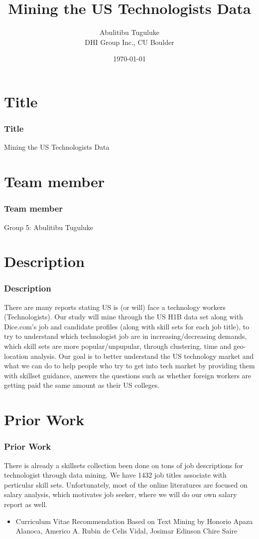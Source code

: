 \documentclass[10pt,mathserif]{beamer}
\title{\large \bfseries Mining the US Technologists Data}
\author{Abulitibu Tuguluke\\[3ex]
	DHI Group Inc., CU Boulder}
\date{\today}
\begin{document}
	
	\frame{
		\thispagestyle{empty}
		\titlepage
	}
	
	\section{Title}
	\begin{frame}
		\frametitle{Title}
		\centering
\large {Mining the US Technologists Data}
		\end{frame}
	
	\section{Team member}
\begin{frame}
	\frametitle{Team member}
		\centering
Group 5: Abulitibu Tuguluke
\end{frame}

	\section{Description}
\begin{frame}
	\frametitle{Description}
	There are many reports stating US is (or will) face a technology workers (Technologists). Our study will mine through the US H1B data set along with Dice.com's job and candidate profiles (along with skill sets for each job title), to try to understand which technologist job are in increasing/decreasing demands, which skill sets are more popular/unpupular, through clustering, time and geo-location analysis. Our goal is to better understand the US technology market and what we can do to help people who try to get into tech market by providing them with skillset guidance, answers the questions such as whether foreign workers are getting paid the same amount as their US colleges. 
\end{frame}
	
		\section{Prior Work}
	\begin{frame}
		\frametitle{Prior Work}
\begin{tcolorbox}[colback=white,colframe=blue,title=]
There is already a skillsets collection been done on tons of job descriptions for technologist through data mining. We have 1432 job titles associate with perticular skill sets. Unfortunately, most of the online literatures are focused on salary analysis, which motivates job seeker, where we will do our own salary report as well.
		\end{tcolorbox}
	\begin{tcolorbox}[colback=white,colframe=blue,title=Papers ]
	\begin{itemize}
		\item Curriculum Vitae Recommendation Based on Text Mining by Honorio Apaza Alanoca, Americo A. Rubin de Celis Vidal, Josimar Edinson Chire Saire
		
	\end{itemize}
\end{tcolorbox}		
	\end{frame}
\end{document}
